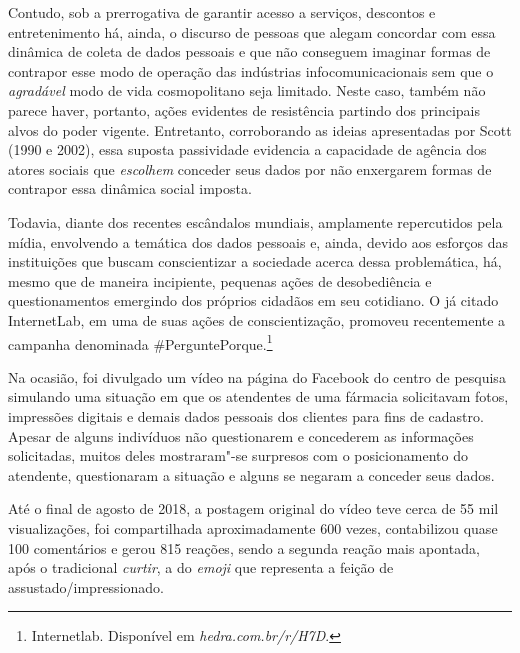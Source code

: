 Contudo, sob a prerrogativa de garantir acesso a serviços, descontos e
entretenimento há, ainda, o discurso de pessoas que alegam concordar com
essa dinâmica de coleta de dados pessoais e que não conseguem imaginar
formas de contrapor esse modo de operação das indústrias
infocomunicacionais sem que o \textit{agradável} modo de vida cosmopolitano
seja limitado. Neste caso, também não parece haver, portanto, ações
evidentes de resistência partindo dos principais alvos do poder vigente.
Entretanto, corroborando as ideias apresentadas por Scott (1990 e 2002),
essa suposta passividade evidencia a capacidade de agência dos atores
sociais que \textit{escolhem} conceder seus dados por não enxergarem formas
de contrapor essa dinâmica social imposta.

Todavia, diante dos recentes escândalos mundiais, amplamente
repercutidos pela mídia, envolvendo a temática dos dados pessoais e,
ainda, devido aos esforços das instituições que buscam conscientizar a
sociedade acerca dessa problemática, há, mesmo que de maneira
incipiente, pequenas ações de desobediência e questionamentos emergindo
dos próprios cidadãos em seu cotidiano. O já citado InternetLab, em uma
de suas ações de conscientização, promoveu recentemente a campanha
denominada \#PerguntePorque.\footnote{Internetlab. Disponível em \textit{hedra.com.br/r/H7D}.}

Na ocasião, foi divulgado um vídeo na página do Facebook do centro de
pesquisa simulando uma situação em que os atendentes de uma fármacia
solicitavam fotos, impressões digitais e demais dados pessoais dos
clientes para fins de cadastro. Apesar de alguns indivíduos não
questionarem e concederem as informações solicitadas, muitos deles
mostraram"-se surpresos com o posicionamento do atendente, questionaram a
situação e alguns se negaram a conceder seus dados.


Até o final de agosto de 2018, a postagem original do vídeo teve cerca
de 55 mil visualizações, foi compartilhada aproximadamente 600 vezes,
contabilizou quase 100 comentários e gerou 815 reações, sendo a segunda
reação mais apontada, após o tradicional \textit{curtir}, a do \textit{emoji}
que representa a feição de assustado/impressionado.

